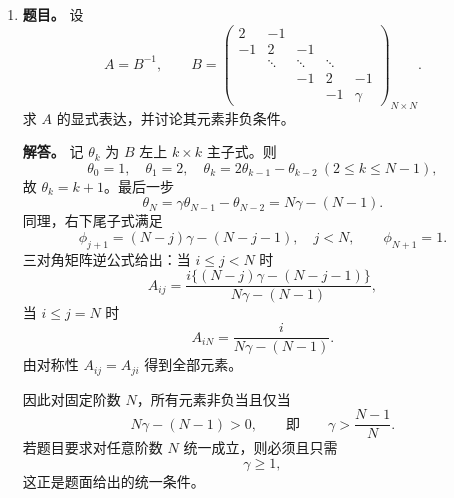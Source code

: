 ﻿\documentclass[UTF8,12pt]{ctexart}
\begin{document}
\begin{enumerate}[label=\textbf{\arabic*.},leftmargin=2.2em]
\item \textbf{题目。} 设
\[
A=B^{-1},\qquad
B=\begin{pmatrix}
2&-1\\
-1&2&-1\\
&\ddots&\ddots&\ddots\\
&&-1&2&-1\\
&&&-1&\gamma
\end{pmatrix}_{N\times N}.
\]
求 \(A\) 的显式表达，并讨论其元素非负条件。

\textbf{解答。} 记 \(\theta_k\) 为 \(B\) 左上 \(k\times k\) 主子式。则
\[
\theta_0=1,\quad \theta_1=2,\quad \theta_k=2\theta_{k-1}-\theta_{k-2}\ (2\le k\le N-1),
\]
故 \(\theta_k=k+1\)。最后一步
\[
\theta_N=\gamma\theta_{N-1}-\theta_{N-2}=N\gamma-(N-1).
\]
同理，右下尾子式满足
\[
\phi_{j+1}=(N-j)\gamma-(N-j-1),\quad j<N,\qquad \phi_{N+1}=1.
\]
三对角矩阵逆公式给出：当 \(i\le j<N\) 时
\[
A_{ij}=\frac{i\{(N-j)\gamma-(N-j-1)\}}{N\gamma-(N-1)},
\]
当 \(i\le j=N\) 时
\[
A_{iN}=\frac{i}{N\gamma-(N-1)}.
\]
由对称性 \(A_{ij}=A_{ji}\) 得到全部元素。

因此对固定阶数 \(N\)，所有元素非负当且仅当
\[
N\gamma-(N-1)>0,
\qquad\text{即}\qquad \gamma>\frac{N-1}{N}.
\]
若题目要求对任意阶数 \(N\) 统一成立，则必须且只需
\[
\gamma\ge1,
\]
这正是题面给出的统一条件。
\end{enumerate}
\end{document}
